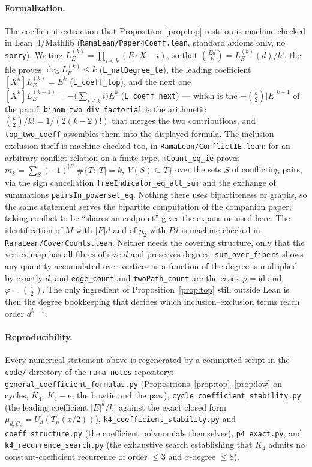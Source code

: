 \documentclass[11pt]{article}
\theoremstyle{remark}
\begin{document}
\paragraph{Formalization.}
The coefficient extraction that Proposition~\ref{prop:top} rests on is machine-checked in
Lean~4/Mathlib (\texttt{RamaLean/Paper4Coeff.lean}, standard axioms only, no
\texttt{sorry}). Writing $L_E^{(k)}=\prod_{i<k}(E\cdot X-i)$, so that
$\binom{Ed}{k}=L_E^{(k)}(d)/k!$, the file proves $\deg L_E^{(k)}\le k$
(\texttt{L\_natDegree\_le}), the leading coefficient $[X^k]L_E^{(k)}=E^k$
(\texttt{L\_coeff\_top}), and the next one
$[X^k]L_E^{(k+1)}=-\bigl(\sum_{i\le k}i\bigr)E^k$ (\texttt{L\_coeff\_next}) --- which is
the $-\binom k2|E|^{k-1}$ of the proof. \texttt{binom\_two\_div\_factorial} is the
arithmetic $\binom k2/k!=1/(2(k-2)!)$ that merges the two contributions, and
\texttt{top\_two\_coeff} assembles them into the displayed formula. The inclusion--exclusion itself is machine-checked too, in
\texttt{RamaLean/ConflictIE.lean}: for an arbitrary conflict relation on a finite type,
\texttt{mCount\_eq\_ie} proves
$m_k=\sum_{S}(-1)^{|S|}\,\#\{T:|T|=k,\ V(S)\subseteq T\}$ over the sets $S$ of conflicting
pairs, via the sign cancellation \texttt{freeIndicator\_eq\_alt\_sum} and the exchange of
summations \texttt{pairsIn\_powerset\_eq}. Nothing there uses bipartiteness or graphs, so
the same statement serves the bipartite computation of the companion paper; taking
conflict to be ``shares an endpoint'' gives the expansion used here. The identification of $M$ with $|E|d$ and of $p_2$ with $Pd$ is machine-checked in
\texttt{RamaLean/CoverCounts.lean}. Neither needs the covering structure, only that the
vertex map has all fibres of size $d$ and preserves degrees: \texttt{sum\_over\_fibers}
shows any quantity accumulated over vertices as a function of the degree is multiplied by
exactly $d$, and \texttt{edge\_count} and \texttt{twoPath\_count} are the cases
$\varphi=\mathrm{id}$ and $\varphi=\binom{\cdot}{2}$. The only ingredient of
Proposition~\ref{prop:top} still outside Lean is then the degree bookkeeping that decides
which inclusion--exclusion terms reach order $d^{k-1}$.

\paragraph{Reproducibility.}
Every numerical statement above is regenerated by a committed script in the
\texttt{code/} directory of the \texttt{rama-notes} repository:
\texttt{general\_coefficient\_formulas.py} (Propositions~\ref{prop:top}--\ref{prop:low} on
cycles, $K_4$, $K_4-e$, the bowtie and the paw),
\texttt{cycle\_coefficient\_stability.py} (the leading coefficient $|E|^k/k!$ against the
exact closed form $\mu_{d,C_n}=U_d(T_n(x/2))$),
\texttt{k4\_coefficient\_stability.py} and \texttt{coeff\_structure.py} (the coefficient
polynomials themselves), \texttt{p4\_exact.py}, and
\texttt{k4\_recurrence\_search.py} (the exhaustive search establishing that $K_4$ admits no
constant-coefficient recurrence of order $\le3$ and $x$-degree $\le8$).
\end{document}
